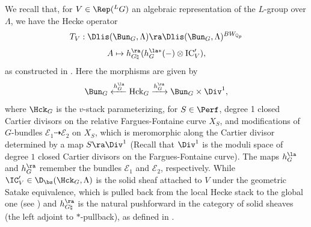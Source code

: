 \documentclass[letterpaper,11pt]{amsart}
\begin{document}
We recall that, for $V \in \Rep(\phantom{}^{L}G)$ an algebraic representation of the $L$-group over $\Lambda$, we have the Hecke operator 
\begin{equation}{\label{eqn: HeckeOperator}} T_{V}: \Dlis(\Bun_{G},\Lambda) \ra \Dlis(\Bun_{G},\Lambda)^{BW_{\mathbb{Q}_{p}}} \end{equation}
\[ A \mapsto h_{G\natural}^{\ra}(h_{G}^{\la*}(-) \otimes \mathrm{IC}'_{V}), \]
as constructed in \cite[Section~IX.2]{FSGeomLLC}. Here the morphisms are given by
\begin{equation}{\label{eqn: FullHeckeDiagram}}
 \Bun_{G} \xleftarrow{h^{\la}_{G}} \mathrm{Hck}_{G} \xrightarrow{h^{\ra}_{G}} \Bun_{G} \times \Div^{1}, 
\end{equation}
where $\Hck_{G}$ is the $v$-stack parameterizing, for $S \in \Perf$, degree 1 closed Cartier divisors on the relative Fargues-Fontaine curve $X_S$, and modifications of $G$-bundles $\mathcal{E}_{1} \dashrightarrow \mathcal{E}_{2}$ on $X_{S}$, which is meromorphic along the Cartier divisor determined by a map $S \ra \Div^{1}$ (Recall that $\Div^{1}$ is the moduli space of degree $1$ closed Cartier divisors on the Fargues-Fontaine curve). The maps $h_{G}^{\la}$ and $h_{G}^{\ra}$ remember the bundles $\mathcal{E}_{1}$ and $\mathcal{E}_{2}$, respectively. While $\IC'_{V} \in \D_{\bs}(\Hck_{G},\Lambda)$ is the solid sheaf attached to $V$ under the geometric Satake equivalence, which is pulled back from the local Hecke stack to the global one (see \cite[Section~IX.2]{FSGeomLLC}) and $h_{G\natural}^{\ra}$ is the natural pushforward in the category of solid sheaves (the left adjoint to $*$-pullback), as defined in \cite[Section~VII.3]{FSGeomLLC}. 
\end{document}
